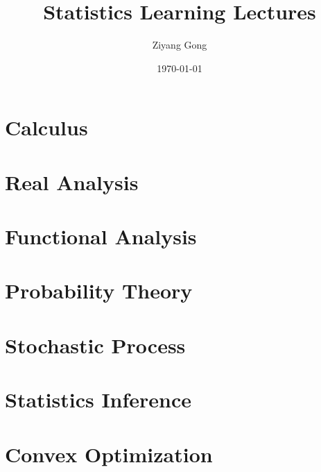 \documentclass[pad,12pt,mtpro2]{elegantbook}
\title{Statistics Learning Lectures}
\author{Ziyang Gong}
\date{\today}
\begin{document}
\maketitle
\tableofcontents

\mainmatter
\hypersetup{pageanchor=true}

\part{Calculus}




\part{Real Analysis}



\part{Functional Analysis}

\part{Probability Theory}






\part{Stochastic Process}




\part{Statistics Inference}






\part{Convex Optimization}




\end{document}
